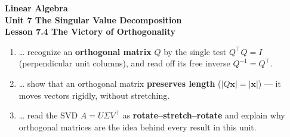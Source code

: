 \documentclass[10pt]{article}
\begin{document}
\vspace{-0.8in}

\begin{center}
  {\color{white}\textbf{\LARGE Linear Algebra}}\\[4pt]
  {\color{blushmid}\large\textbf{Unit 7 \quad The Singular Value Decomposition}}\\[6pt]
  {\color{white}\textbf{\large Lesson 7.4 \quad The Victory of Orthogonality}}
\end{center}

\vspace{0.22in}
\namedateperiod
\vspace{0.18in}

\begin{learningtargetbox}
\small
\begin{enumerate}[leftmargin=1.5em, itemsep=5pt]
  \item \ldots{} recognize an \textbf{orthogonal matrix} $Q$ by the single test $Q^{\top}Q=I$ (perpendicular unit columns), and read off its free inverse $Q^{-1}=Q^{\top}$.
  \item \ldots{} show that an orthogonal matrix \textbf{preserves length} ($|Q\mathbf{x}|=|\mathbf{x}|$) --- it moves vectors rigidly, without stretching.
  \item \ldots{} read the SVD $A=U\Sigma V^{\top}$ as \textbf{rotate--stretch--rotate} and explain why orthogonal matrices are the idea behind every result in this unit.
\end{enumerate}
\end{learningtargetbox}

\vspace{0.14in}
\end{document}
